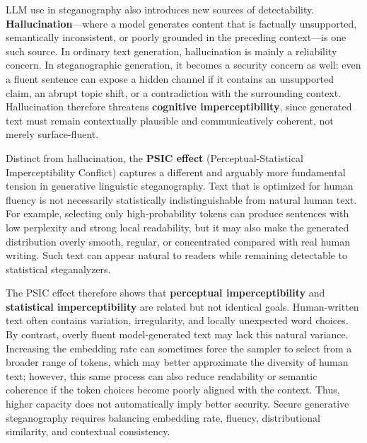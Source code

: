 
LLM use in steganography also introduces new sources of detectability. \textbf{Hallucination}---where a model generates content that is factually unsupported, semantically inconsistent, or poorly grounded in the preceding context---is one such source. In ordinary text generation, hallucination is mainly a reliability concern. In steganographic generation, it becomes a security concern as well: even a fluent sentence can expose a hidden channel if it contains an unsupported claim, an abrupt topic shift, or a contradiction with the surrounding context. Hallucination therefore threatens \textbf{cognitive imperceptibility}, since generated text must remain contextually plausible and communicatively coherent, not merely surface-fluent.

Distinct from hallucination, the \textbf{PSIC effect} (Perceptual-Statistical Imperceptibility Conflict) \cite{yang2020vae} captures a different and arguably more fundamental tension in generative linguistic steganography. Text that is optimized for human fluency is not necessarily statistically indistinguishable from natural human text. For example, selecting only high-probability tokens can produce sentences with low perplexity and strong local readability, but it may also make the generated distribution overly smooth, regular, or concentrated compared with real human writing. Such text can appear natural to readers while remaining detectable to statistical steganalyzers. \cite{yang2020vae}

The PSIC effect therefore shows that \textbf{perceptual imperceptibility} and \textbf{statistical imperceptibility} are related but not identical goals. Human-written text often contains variation, irregularity, and locally unexpected word choices. By contrast, overly fluent model-generated text may lack this natural variance. Increasing the embedding rate can sometimes force the sampler to select from a broader range of tokens, which may better approximate the diversity of human text; however, this same process can also reduce readability or semantic coherence if the token choices become poorly aligned with the context. Thus, higher capacity does not automatically imply better security. Secure generative steganography requires balancing embedding rate, fluency, distributional similarity, and contextual consistency.